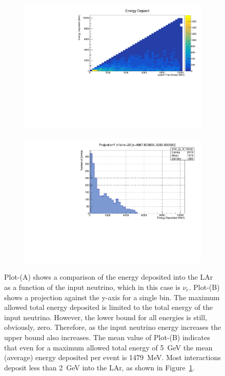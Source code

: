 \begin{figure}
\centering
\begin{subfigure}{.5\textwidth}
  \centering
  \includegraphics[width=\textwidth]{images/electron_nu_energy_deposit.pdf}
  \caption{}
\end{subfigure}%
\begin{subfigure}{.5\textwidth}
  \centering
  \includegraphics[width=\textwidth]{images/electron_nu_energy_deposit_slice.pdf}
  \caption{}
\end{subfigure}
\caption{Plot-(A) shows a comparison of the energy deposited into the LAr as a function of the input neutrino, which in this case is $\nu_{e}$.
Plot-(B) shows a projection against the y-axis for a single bin.
The maximum allowed total energy deposited is limited to the total energy of the input neutrino.
However, the lower bound for all energies is still, obviously, zero.
Therefore, as the input neutrino energy increases the upper bound also increases.
The mean value of Plot-(B) indicates that even for a maximum allowed total energy of 5~\unit{GeV} the mean (average) energy deposited per event is 1479~\unit{MeV}.
Most interactions deposit less than 2~\unit{GeV} into the LAr, as shown in Figure~\ref{fig:example_energy_deposit}.
}
\label{fig:example_energy_deposit}
\end{figure}

